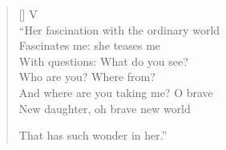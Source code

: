 \begin{verse}[\versewidth]
V\\
``Her fascination with the ordinary world\\
Fascinates me: she teases me\\
With questions: What do you see?\\
Who are you? Where from?\\
And where are you taking me? O brave\\
New daughter, oh brave new world

That has such wonder in her.''
\end{verse}
